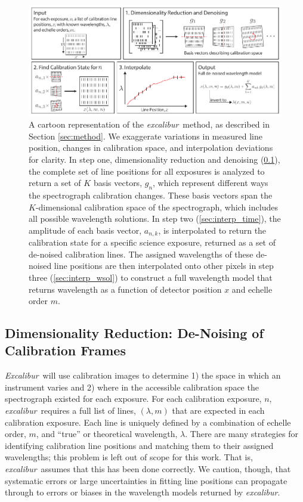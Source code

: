 \documentclass[modern]{aastex63}
\newcommand{\project}[1]{\textsl{#1}}
\newcommand{\name}{\project{excalibur}}
\newcommand{\Name}{\project{Excalibur}}
\begin{document}
\begin{figure}[t]
\centering
\includegraphics[width=\textwidth]{Figures/methodCartoon.pdf}
\caption{A cartoon representation of the \name\ method, as described in Section \ref{sec:method}.  We exaggerate variations in measured line position, changes in calibration space, and interpolation deviations for clarity.  In step one, dimensionality reduction and denoising (\textsection \ref{sec:denoising}), the complete set of line positions for all exposures is analyzed to return a set of $K$ basis vectors, $g_n$, which represent different ways the spectrograph calibration changes.  These basis vectors span the $K$-dimensional calibration space of the spectrograph, which includes all possible wavelength solutions.  In step two (\textsection \ref{sec:interp_time}), the amplitude of each basis vector, $a_{n,k}$, is interpolated to return the calibration state for a specific science exposure, returned as a set of de-noised calibration lines.  The assigned wavelengths of these de-noised line positions are then interpolated onto other pixels in step three (\textsection \ref{sec:interp_wsol}) to construct a full wavelength model that returns wavelength as a function of detector position $x$ and echelle order $m$.}
\label{fig:cartoon}
\end{figure} 

\subsection{Dimensionality Reduction: De-Noising of Calibration Frames} \label{sec:denoising}
\Name\ will use calibration images to determine 1) the space in which an instrument varies and 2) where in the accessible calibration space the spectrograph existed for each exposure.  For each calibration exposure, $n$, \name\ requires a full list of lines, $(\lambda,m)$ that are expected in each calibration exposure.  Each line is uniquely defined by a combination of echelle order, $m$, and ``true'' or theoretical wavelength, $\lambda$.  There are many strategies for identifying calibration line positions and matching them to their assigned wavelengths; this problem is left out of scope for this work.  That is, \name\ assumes that this has been done correctly.  We caution, though, that systematic errors or large uncertainties in fitting line positions can propagate through to errors or biases in the wavelength models returned by \name.
\end{document}
